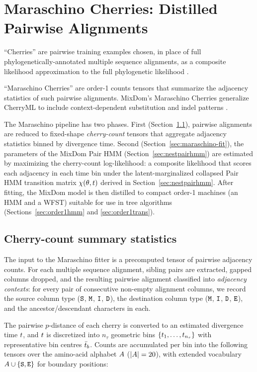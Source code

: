 \section{Maraschino Cherries: Distilled Pairwise Alignments}
\label{sec:maraschino}

``Cherries'' are pairwise training examples chosen, in place of full phylogenetically-annotated multiple sequence alignments,
as a composite likelihood approximation to the full phylogenetic likelihood \cite{Prillo2022CherryML}.

``Maraschino Cherries'' are order-1 counts tensors that summarize the adjacency statistics of such pairwise alignments.
MixDom's Maraschino Cherries generalize CherryML to include context-dependent substitution and indel patterns \cite{Prillo2022CherryML}.

The Maraschino pipeline has two phases.
First (Section~\ref{sec:maraschino-counts}), pairwise alignments are reduced to fixed-shape \emph{cherry-count} tensors that aggregate adjacency statistics binned by divergence time.
Second (Section~\ref{sec:maraschino-fit}), the parameters of the MixDom Pair HMM (Section~\ref{sec:nestpairhmm}) are estimated by maximizing the cherry-count log-likelihood: a composite likelihood that scores each adjacency in each time bin under the latent-marginalized collapsed Pair HMM transition matrix $\chi(\theta,t)$ derived in Section~\ref{sec:nestpairhmm}.
After fitting, the MixDom model is then distilled to compact order-1 machines (an HMM and a WFST) suitable for use in tree algorithms (Sections~\ref{sec:order1hmm} and \ref{sec:order1trans}).

\subsection{Cherry-count summary statistics}
\label{sec:maraschino-counts}

The input to the Maraschino fitter is a precomputed tensor of pairwise
adjacency counts. For each multiple sequence alignment, sibling pairs are
extracted, gapped columns dropped, and the resulting pairwise alignment
classified into \emph{adjacency contexts}: for every pair of consecutive
non-empty alignment columns, we record the source column type
(${\tt S}$, ${\tt M}$, ${\tt I}$, ${\tt D}$), the destination column type
(${\tt M}$, ${\tt I}$, ${\tt D}$, ${\tt E}$), and the ancestor/descendant
characters in each.

The pairwise $p$-distance of each cherry is converted to an estimated
divergence time $t$, and $t$ is discretized into
$n_\tau$ geometric bins $\{t_1,\ldots,t_{n_\tau}\}$ with
representative bin centres $\bar{t}_b$.
Counts are accumulated per bin into the following tensors over the
amino-acid alphabet $A$ ($|A|=20$), with extended
vocabulary $A \cup \{{\tt S}, {\tt E}\}$ for boundary positions:


